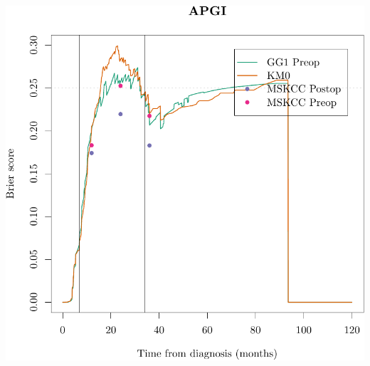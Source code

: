 \documentclass{article}\usepackage[]{graphicx}\usepackage[]{color}
\makeatletter
\def\maxwidth{ %
  \ifdim\Gin@nat@width>\linewidth
    \linewidth
  \else
    \Gin@nat@width
  \fi
}
\newenvironment{knitrout}{}{} %
\makeatother
\begin{document}
\begin{knitrout}
{\centering \includegraphics[width=\maxwidth]{figure/07-prob-bs-paths-plot-apgi-1} 

}



\end{knitrout}
\end{document}
